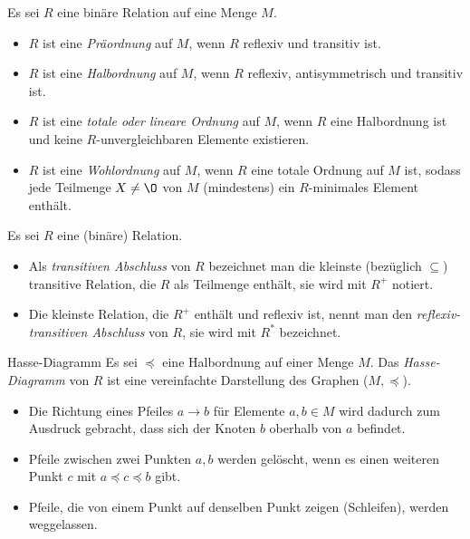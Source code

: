 \begin{definition}{}
    Es sei $R$ eine binäre Relation auf eine Menge $M$.
    \begin{itemize}
        \item $R$ ist eine \emph{Präordnung} auf $M$, wenn $R$ reflexiv und transitiv ist.
        \item $R$ ist eine \emph{Halbordnung} auf $M$, wenn $R$ reflexiv, antisymmetrisch und transitiv ist.
        \item $R$ ist eine \emph{totale oder lineare Ordnung} auf $M$, wenn $R$ eine Halbordnung ist und keine $R$-unvergleichbaren Elemente existieren.
        \item $R$ ist eine \emph{Wohlordnung} auf $M$, wenn $R$ eine totale Ordnung auf $M$ ist, sodass jede Teilmenge $X \neq \O$ von $M$ (mindestens) ein $R$-minimales Element enthält.
    \end{itemize}
\end{definition}

\begin{definition}{}
    Es sei $R$ eine (binäre) Relation.
    \begin{itemize}
        \item Als \emph{transitiven Abschluss} von $R$ bezeichnet man die kleinste (bezüglich $\subseteq$) transitive Relation, die $R$ als Teilmenge enthält, sie wird mit $R^+$ notiert.
        \item Die kleinste Relation, die $R^+$ enthält und reflexiv ist, nennt man den \emph{reflexiv-transitiven Abschluss} von $R$, sie wird mit $R^*$ bezeichnet.
    \end{itemize}
\end{definition}




\begin{definition}{Hasse-Diagramm}
    Es sei $\preceq$ eine Halbordnung auf einer Menge $M$.
    Das \emph{Hasse-Diagramm} von $R$ ist eine vereinfachte Darstellung des Graphen ($M,\preceq$).
    \begin{itemize}
        \item Die Richtung eines Pfeiles $a \rightarrow b$ für Elemente $a,b \in M$ wird dadurch zum Ausdruck gebracht, dass sich der Knoten $b$ oberhalb von $a$ befindet.
        \item Pfeile zwischen zwei Punkten $a,b$ werden gelöscht, wenn es einen weiteren Punkt $c$ mit $a \preceq c \preceq b$ gibt.
        \item Pfeile, die von einem Punkt auf denselben Punkt zeigen (Schleifen), werden weggelassen.
    \end{itemize}
\end{definition}

